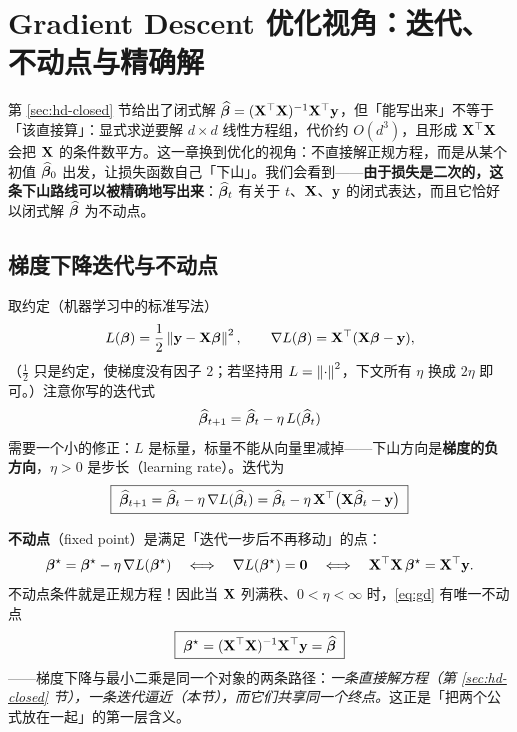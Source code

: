 \section{Gradient Descent 优化视角：迭代、不动点与精确解}\label{sec:gd}

第 \ref{sec:hd-closed} 节给出了闭式解 $\widehat{\bm{\beta}} = (\mathbf{X}^\top\mathbf{X})^{-1}\mathbf{X}^\top\mathbf{y}$，但「能写出来」不等于「该直接算」：显式求逆要解 $d \times d$ 线性方程组，代价约 $O(d^3)$，且形成 $\mathbf{X}^\top\mathbf{X}$ 会把 $\mathbf{X}$ 的条件数平方。这一章换到优化的视角：不直接解正规方程，而是从某个初值 $\widehat{\bm{\beta}}_0$ 出发，让损失函数自己「下山」。我们会看到——\textbf{由于损失是二次的，这条下山路线可以被精确地写出来}：$\widehat{\bm{\beta}}_t$ 有关于 $t$、$\mathbf{X}$、$\mathbf{y}$ 的闭式表达，而且它恰好以闭式解 $\widehat{\bm{\beta}}$ 为不动点。

\subsection{梯度下降迭代与不动点}\label{sec:gd-iter}

取约定（机器学习中的标准写法）
\begin{equation}\label{eq:gd-loss}
  L(\bm{\beta}) = \frac{1}{2}\left\lVert \mathbf{y} - \mathbf{X} \bm{\beta} \right\rVert^2,
  \qquad
  \nabla L(\bm{\beta}) = \mathbf{X}^\top (\mathbf{X} \bm{\beta} - \mathbf{y}),
\end{equation}
（$\frac12$ 只是约定，使梯度没有因子 $2$；若坚持用 $L = \left\lVert \cdot \right\rVert^2$，下文所有 $\eta$ 换成 $2\eta$ 即可。）注意你写的迭代式
\[
  \widehat{\bm{\beta}}_{t+1} = \widehat{\bm{\beta}}_t - \eta\, L(\widehat{\bm{\beta}}_t)
\]
需要一个小的修正：$L$ 是标量，标量不能从向量里减掉——下山方向是\textbf{梯度的负方向}，$\eta > 0$ 是步长（learning rate）。迭代为
\begin{equation}\label{eq:gd}
  \boxed{\;\widehat{\bm{\beta}}_{t+1} = \widehat{\bm{\beta}}_t - \eta\, \nabla L(\widehat{\bm{\beta}}_t)
       = \widehat{\bm{\beta}}_t - \eta\, \mathbf{X}^\top \big( \mathbf{X} \widehat{\bm{\beta}}_t - \mathbf{y} \big)\;}
\end{equation}

\textbf{不动点}（fixed point）是满足「迭代一步后不再移动」的点：
\begin{equation}\label{eq:fixed}
  \bm{\beta}^\star = \bm{\beta}^\star - \eta\, \nabla L(\bm{\beta}^\star)
  \quad\Longleftrightarrow\quad
  \nabla L(\bm{\beta}^\star) = \mathbf{0}
  \quad\Longleftrightarrow\quad
  \mathbf{X}^\top \mathbf{X} \, \bm{\beta}^\star = \mathbf{X}^\top \mathbf{y} .
\end{equation}
不动点条件就是正规方程！因此当 $\mathbf{X}$ 列满秩、$0 < \eta < \infty$ 时，\eqref{eq:gd} 有唯一不动点
\begin{equation}\label{eq:gd-fixed}
  \boxed{\;\bm{\beta}^\star = (\mathbf{X}^\top \mathbf{X})^{-1} \mathbf{X}^\top \mathbf{y} = \widehat{\bm{\beta}}\;}
\end{equation}
——梯度下降与最小二乘是同一个对象的两条路径：\textit{一条直接解方程（第 \ref{sec:hd-closed} 节），一条迭代逼近（本节），而它们共享同一个终点。}这正是「把两个公式放在一起」的第一层含义。

